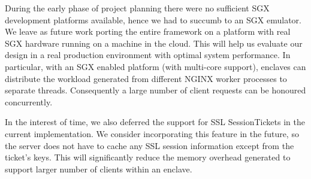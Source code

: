 \documentclass[../main.tex]{subfiles}
\begin{document}
During the early phase of project planning there were no sufficient SGX
development platforms available, hence we had to succumb to an SGX emulator. We
leave as future work porting the entire framework on a platform with real SGX
hardware running on a machine in the cloud. This will help us evaluate our
design in a real production environment with optimal system performance. In
particular, with an SGX enabled platform (with multi-core support), enclaves
can distribute the workload generated from different NGINX worker processes to
separate threads. Consequently a large number of client requests can be
honoured concurrently.

In the interest of time, we also deferred the support for SSL SessionTickets in
the current implementation. We consider incorporating this feature in the
future, so the server does not have to cache any SSL session information except
from the ticket's keys. This will significantly reduce the memory overhead
generated to support larger number of clients within an enclave.
\end{document}
